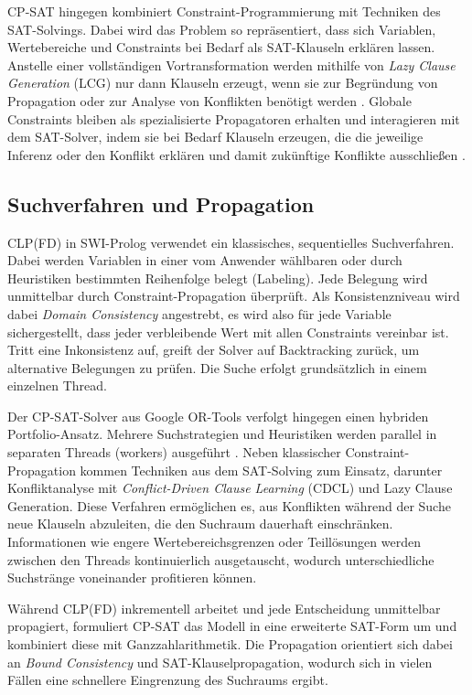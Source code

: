 \documentclass[12pt,a4paper]{article}
\begin{document}
CP-SAT hingegen kombiniert Constraint-Programmierung mit Techniken des SAT-Solvings.
Dabei wird das Problem so repräsentiert, dass sich Variablen, Wertebereiche und Constraints bei Bedarf als SAT-Klauseln erklären lassen.
Anstelle einer vollständigen Vortransformation werden mithilfe von \emph{Lazy Clause Generation} (LCG) nur dann Klauseln erzeugt, wenn sie zur Begründung von Propagation oder zur Analyse von Konflikten benötigt werden \cite{Stuckey2010}.
Globale Constraints bleiben als spezialisierte Propagatoren erhalten und interagieren mit dem SAT-Solver, indem sie bei Bedarf Klauseln erzeugen, die die jeweilige Inferenz oder den Konflikt erklären und damit zukünftige Konflikte ausschließen \cite{cp-sat-primer}.
\subsection{Suchverfahren und Propagation}
\label{sec:search_prop}
CLP(FD) in SWI-Prolog verwendet ein klassisches, sequentielles Suchverfahren.
Dabei werden Variablen in einer vom Anwender wählbaren oder durch Heuristiken bestimmten Reihenfolge belegt (Labeling).
Jede Belegung wird unmittelbar durch Constraint-Propagation überprüft.
Als Konsistenzniveau wird dabei \emph{Domain Consistency} angestrebt, es wird also für jede Variable sichergestellt, dass jeder verbleibende Wert mit allen Constraints vereinbar ist.
Tritt eine Inkonsistenz auf, greift der Solver auf Backtracking zurück, um alternative Belegungen zu prüfen.
Die Suche erfolgt grundsätzlich in einem einzelnen Thread.

Der CP-SAT-Solver aus Google OR-Tools verfolgt hingegen einen hybriden Portfolio-Ansatz.
Mehrere Suchstrategien und Heuristiken werden parallel in separaten Threads (workers) ausgeführt \cite{perron}.
Neben klassischer Constraint-Propagation kommen Techniken aus dem SAT-Solving zum Einsatz, darunter Konfliktanalyse mit \emph{Conflict-Driven Clause Learning} (CDCL) und Lazy Clause Generation.
Diese Verfahren ermöglichen es, aus Konflikten während der Suche neue Klauseln abzuleiten, die den Suchraum dauerhaft einschränken.
Informationen wie engere Wertebereichsgrenzen oder Teillösungen werden zwischen den Threads kontinuierlich ausgetauscht, wodurch unterschiedliche Suchstränge voneinander profitieren können. 

Während CLP(FD) inkrementell arbeitet und jede Entscheidung unmittelbar propagiert, formuliert CP-SAT das Modell in eine erweiterte SAT-Form um und kombiniert diese mit Ganzzahlarithmetik.
Die Propagation orientiert sich dabei an \emph{Bound Consistency} und SAT-Klauselpropagation, wodurch sich in vielen Fällen eine schnellere Eingrenzung des Suchraums ergibt.
\end{document}
